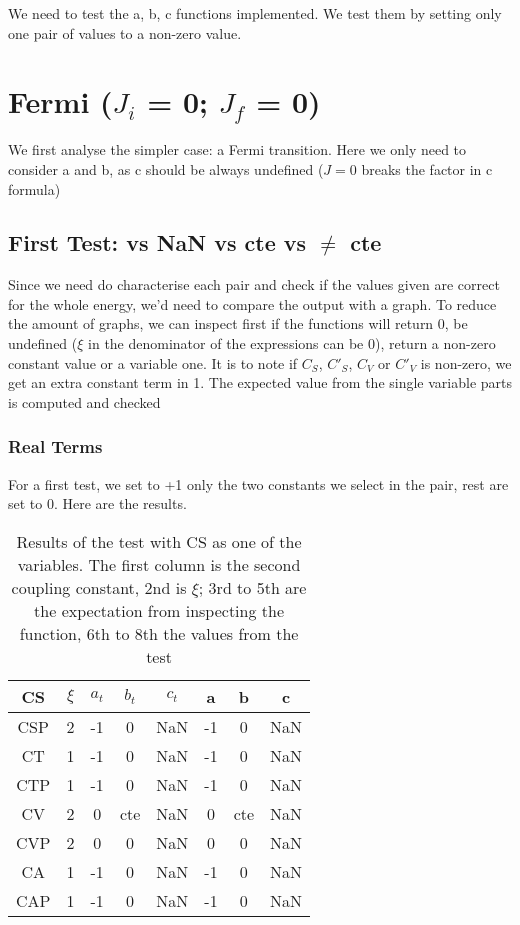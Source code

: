 \documentclass[twocolumn]{article}
\title{}
\author{}
\begin{document}
\maketitle

We need to test the a, b, c functions implemented. We test them by setting only one pair of values to a non-zero value.

\section{Fermi ($J_i$ = 0; $J_f$ = 0)}

We first analyse the simpler case: a Fermi transition. Here we only need to consider a and b, as c should be always undefined ($J = 0$ breaks the factor in c formula)

\subsection{First Test:   vs NaN vs cte  vs $\neq$ cte}

Since we need do characterise each pair and check if the values given are correct for the whole energy, we'd need to compare the output with a graph. To reduce the amount of graphs, we can inspect first if the functions will return 0, be undefined ($\xi$ in the denominator of the expressions can be 0), return a non-zero constant value or a variable one.  It is to note if $C_S$, $C'_S$, $C_V$ or $C'_V$ is non-zero, we get an extra constant term in 1. The expected value from the single variable parts is computed and checked

\subsubsection{Real Terms}

For a first test, we set to +1 only the two constants we select in the pair, rest are set to 0. Here are the results.

\begin{table}[H]
	\begin{tabular}{|c|c|c|c|c|c|c|c|}
		\hline
		CS & $\xi $& $a_t$ & $b_t$ & $c_t$ & a & b & c \\
		\hline
		CSP & 2 &  -1 & 0  &  NaN & -1  & 0  & NaN \\
		\hline
		CT & 1 & -1  &  0 & NaN  & -1  & 0 & NaN \\
		\hline
		CTP & 1 &  -1 &  0 &  NaN  & -1  &  0 & NaN \\
		\hline
		CV & 2 & 0  &  cte &  NaN &  0 & cte  & NaN \\
		\hline
		CVP & 2 & 0  &  0 & NaN  &  0 & 0 & NaN \\
		\hline
		CA & 1 & -1  &  0 & NaN &  -1 & 0  & NaN\\
		\hline
		CAP & 1 &  -1  & 0  & NaN  & -1  &  0 & NaN \\
		\hline
	\end{tabular}
	\caption{Results of the test with CS as one of the variables. The first column is the second coupling constant, 2nd is $\xi$; 3rd to 5th are the expectation from inspecting the function, 6th to 8th the values from the test}
\end{table}
\end{document}
